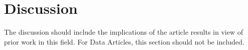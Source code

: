 \section*{Discussion}
The discussion should include the implications of the article results in view of prior work in this field.
For Data Articles, this section should not be included.
